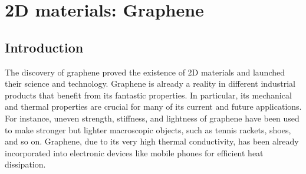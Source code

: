 
\chapter{2D materials: Graphene} %

\label{Chapter8} %




\section{Introduction}

The discovery of graphene\cite{novoselov2004electric,novoselov2005two,novoselov2005twoo,zhang2005experimental} proved 
the existence of 2D materials and launched their science and technology. Graphene is already a reality in different 
industrial products\cite{Kong2019path} that benefit from its fantastic properties. In particular, its mechanical and 
thermal properties are crucial for many of its current and future applications. For instance, uneven strength, 
stiffness, and lightness\cite{lee2008measurement} of graphene have been used to make stronger but lighter macroscopic 
objects, such as tennis rackets, shoes, and so on. Graphene, due to its very high thermal 
conductivity\cite{ghosh2008extremely}, has been already incorporated into electronic devices like mobile phones for 
efficient heat dissipation. \\

